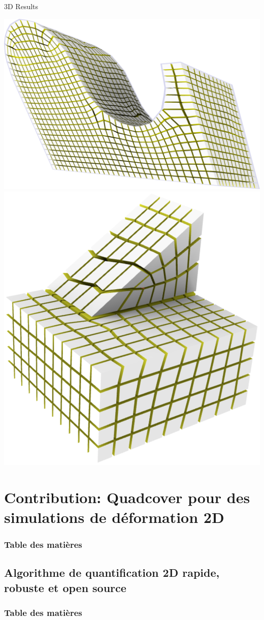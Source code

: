 \documentclass{beamer}
\begin{document}
\begin{frame}{3D Results}
\begin{minipage}[c]{0.45\textwidth}
    \includegraphics[width=.66\linewidth]{img_spm_ff/shear_1.png}
    \includegraphics[width=.66\linewidth]{img_spm_ff/slope_northo_front.png}
    \end{minipage}
\end{frame} 


\section{Contribution: Quadcover pour des simulations de déformation 2D}
\begin{frame}
    \frametitle{Table des matières}
    \tableofcontents[currentsection, sectionstyle=show/shaded, subsectionstyle=show/show/hide]
\end{frame}
\subsection{Algorithme de quantification 2D rapide, robuste et open source}
\begin{frame}
    \frametitle{Table des matières}
    \tableofcontents[currentsubsection, sectionstyle=show/shaded, subsectionstyle=show/shaded/hide]
\end{frame}
\end{document}
